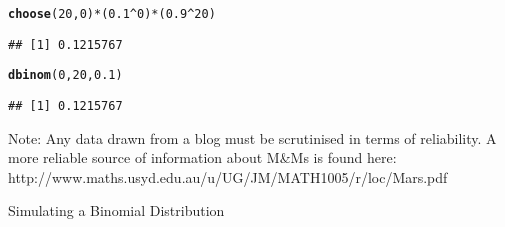 \documentclass[bigtut]{tutorial}\usepackage[]{graphicx}\usepackage[]{color}
\makeatletter
\newcommand{\hlnum}[1]{\textcolor[rgb]{0.686,0.059,0.569}{#1}}%
\newcommand{\hlopt}[1]{\textcolor[rgb]{0,0,0}{#1}}%
\newcommand{\hlstd}[1]{\textcolor[rgb]{0.345,0.345,0.345}{#1}}%
\newcommand{\hlkwd}[1]{\textcolor[rgb]{0.737,0.353,0.396}{\textbf{#1}}}%
\newenvironment{kframe}{%
 \def\at@end@of@kframe{}%
 \ifinner\ifhmode%
  \def\at@end@of@kframe{\end{minipage}}%
  \begin{minipage}{\columnwidth}%
 \fi\fi%
 \def\FrameCommand##1{\hskip\@totalleftmargin \hskip-\fboxsep
 \colorbox{shadecolor}{##1}\hskip-\fboxsep
     \hskip-\linewidth \hskip-\@totalleftmargin \hskip\columnwidth}%
 \MakeFramed {\advance\hsize-\width
   \@totalleftmargin\z@ \linewidth\hsize
   \@setminipage}}%
 {\par\unskip\endMakeFramed%
 \at@end@of@kframe}
\newenvironment{knitrout}{}{} %
\makeatother
\begin{document}
\begin{tutorial}
\begin{questions}
\begin{solution}
\begin{parts}
\begin{knitrout}
\color{fgcolor}\begin{kframe}
\begin{alltt}
\hlkwd{choose}\hlstd{(}\hlnum{20}\hlstd{,}\hlnum{0}\hlstd{)}\hlopt{*}\hlstd{(}\hlnum{0.1}\hlopt{^}\hlnum{0}\hlstd{)}\hlopt{*}\hlstd{(}\hlnum{0.9}\hlopt{^}\hlnum{20}\hlstd{)}
\end{alltt}
\begin{verbatim}
## [1] 0.1215767
\end{verbatim}
\begin{alltt}
\hlkwd{dbinom}\hlstd{(}\hlnum{0}\hlstd{,}\hlnum{20}\hlstd{,}\hlnum{0.1}\hlstd{)}
\end{alltt}
\begin{verbatim}
## [1] 0.1215767
\end{verbatim}
\end{kframe}
\end{knitrout}

\end{parts}

Note: Any data drawn from a blog must be scrutinised in terms of reliability. A more reliable source of information about M\&Ms is found here: \\
http://www.maths.usyd.edu.au/u/UG/JM/MATH1005/r/loc/Mars.pdf
\end{solution}

\newpage
\question Simulating a Binomial Distribution \\

\end{questions}
\end{tutorial}
\end{document}
